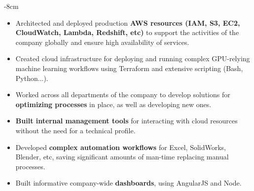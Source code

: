 \documentclass[10pt,a4paper]{altacv}
\begin{document}


\begin{adjustwidth}{}{-8cm}
\makecvheader
\end{adjustwidth}


\begin{itemize}
    \item Architected and deployed production \textbf{AWS resources (IAM, S3, EC2, CloudWatch, Lambda, Redshift, etc)} to support the activities of the company globally and ensure high availability of services.
    \item Created cloud infrastructure for deploying and running complex GPU-relying machine learning workflows using Terraform and extensive scripting (Bash, Python...).
    \item Worked across all departments of the company to develop solutions for \textbf{optimizing processes} in place, as well as developing new ones.
    \item \textbf{Built internal management tools} for interacting with cloud resources without the need for a technical profile.
    \item Developed \textbf{complex automation workflows} for Excel, SolidWorks, Blender, etc, saving significant amounts of man-time replacing manual processes.
    \item Built informative company-wide \textbf{dashboards}, using AngularJS and Node.
\end{itemize}

\divider
\end{document}
